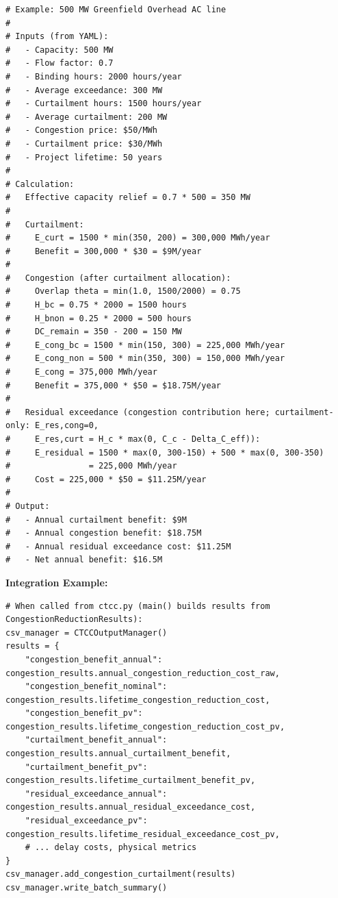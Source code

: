 \documentclass[ctcc_full_documentation.tex]{subfiles}
\begin{document}
\begin{lstlisting}
# Example: 500 MW Greenfield Overhead AC line
# 
# Inputs (from YAML):
#   - Capacity: 500 MW
#   - Flow factor: 0.7
#   - Binding hours: 2000 hours/year
#   - Average exceedance: 300 MW
#   - Curtailment hours: 1500 hours/year
#   - Average curtailment: 200 MW
#   - Congestion price: $50/MWh
#   - Curtailment price: $30/MWh
#   - Project lifetime: 50 years
#
# Calculation:
#   Effective capacity relief = 0.7 * 500 = 350 MW
#   
#   Curtailment:
#     E_curt = 1500 * min(350, 200) = 300,000 MWh/year
#     Benefit = 300,000 * $30 = $9M/year
#   
#   Congestion (after curtailment allocation):
#     Overlap theta = min(1.0, 1500/2000) = 0.75
#     H_bc = 0.75 * 2000 = 1500 hours
#     H_bnon = 0.25 * 2000 = 500 hours
#     DC_remain = 350 - 200 = 150 MW
#     E_cong_bc = 1500 * min(150, 300) = 225,000 MWh/year
#     E_cong_non = 500 * min(350, 300) = 150,000 MWh/year
#     E_cong = 375,000 MWh/year
#     Benefit = 375,000 * $50 = $18.75M/year
#   
#   Residual exceedance (congestion contribution here; curtailment-only: E_res,cong=0,
#     E_res,curt = H_c * max(0, C_c - Delta_C_eff)):
#     E_residual = 1500 * max(0, 300-150) + 500 * max(0, 300-350) 
#                = 225,000 MWh/year
#     Cost = 225,000 * $50 = $11.25M/year
#
# Output:
#   - Annual curtailment benefit: $9M
#   - Annual congestion benefit: $18.75M
#   - Annual residual exceedance cost: $11.25M
#   - Net annual benefit: $16.5M
\end{lstlisting}

\textbf{Integration Example:}

\begin{lstlisting}
# When called from ctcc.py (main() builds results from CongestionReductionResults):
csv_manager = CTCCOutputManager()
results = {
    "congestion_benefit_annual": congestion_results.annual_congestion_reduction_cost_raw,
    "congestion_benefit_nominal": congestion_results.lifetime_congestion_reduction_cost,
    "congestion_benefit_pv": congestion_results.lifetime_congestion_reduction_cost_pv,
    "curtailment_benefit_annual": congestion_results.annual_curtailment_benefit,
    "curtailment_benefit_pv": congestion_results.lifetime_curtailment_benefit_pv,
    "residual_exceedance_annual": congestion_results.annual_residual_exceedance_cost,
    "residual_exceedance_pv": congestion_results.lifetime_residual_exceedance_cost_pv,
    # ... delay costs, physical metrics
}
csv_manager.add_congestion_curtailment(results)
csv_manager.write_batch_summary()
\end{lstlisting}
\end{document}
